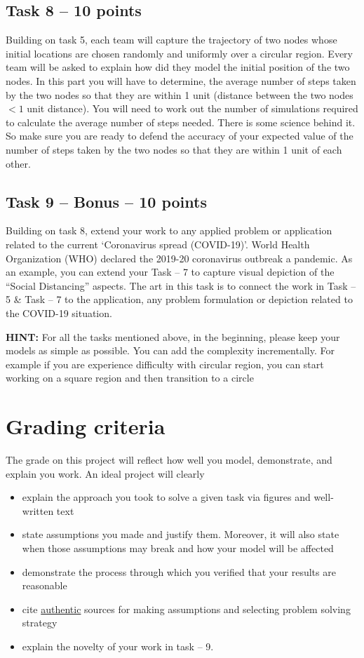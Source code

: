 \documentclass[a4paper, 11pt]{article}
\begin{document}
\subsection {Task 8 -- 10 points}
Building on task 5, each team will capture the trajectory of two nodes whose initial locations are chosen randomly and uniformly over a circular region. Every team will be asked to explain how did they model the initial position of the two nodes. In this part you will have to determine, the average number of steps taken by the two nodes so that they are within 1 unit (distance between the two nodes $< 1$ unit distance). You will need to work out the number of simulations required to calculate the average number of steps needed. There is some science behind it. So make sure you are ready to defend the accuracy of your expected value of the number of steps taken by the two nodes so that they are within 1 unit of each other.

\subsection{Task 9 -- Bonus -- 10 points}
Building on task 8, extend your work to any applied problem or application related to the current ‘Coronavirus spread (COVID-19)’. World Health Organization (WHO) declared the 2019-20 coronavirus outbreak a pandemic. As an example, you can extend your Task -- 7 to capture visual depiction of the “Social Distancing” aspects.  The art in this task is to connect the work in Task -- 5 \& Task -- 7 to the application, any problem formulation or depiction related to the COVID-19 situation.   


\textbf{HINT:} For all the tasks mentioned above, in the beginning, please keep your models as simple as possible. You can add the complexity incrementally. For example if you are experience difficulty with circular region, you can start working on a square region and then transition to a circle


\section{Grading criteria}
The grade on this project will reflect how well you model, demonstrate, and explain you work. An ideal project will clearly 
\begin{itemize}
\item explain the approach you took to solve a given task via figures and well-written text
\item state assumptions you made and justify them. Moreover, it will also state when those assumptions may break and how your model will be affected
\item demonstrate the process through which you verified that your results are reasonable
\item cite \underline{authentic} sources for making assumptions and selecting problem solving strategy
\item explain the novelty of your work in task -- 9.
\end{itemize}
\end{document}
